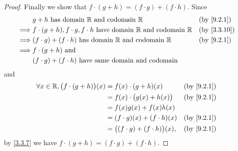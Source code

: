 \begin{proof}
  Finally we show that \(f \cdot (g + h) = (f \cdot g) + (f \cdot h)\).
  Since
  \begin{align*}
             & g + h \text{ has domain } \R \text{ and codomain } \R                                   &  & \by{9.2.1}  \\
    \implies & f \cdot (g + h), f \cdot g, f \cdot h  \text{ have domain } \R \text{ and codomain } \R &  & \by{3.3.10} \\
    \implies & (f \cdot g) + (f \cdot h)  \text{ has domain } \R \text{ and codomain } \R              &  & \by{9.2.1}  \\
    \implies & f \cdot (g + h) \text{ and }                                                                             \\
             & (f \cdot g) + (f \cdot h) \text{ have same domain and codomain}
  \end{align*}
  and
  \begin{align*}
    \forall x \in \R, \big(f \cdot (g + h)\big)(x) & = f(x) \cdot (g + h)(x)                   &  & \by{9.2.1} \\
                                                   & = f(x) \cdot \big(g(x) + h(x)\big)        &  & \by{9.2.1} \\
                                                   & = f(x)g(x) + f(x)h(x)                                     \\
                                                   & = (f \cdot g)(x) + (f \cdot h)(x)         &  & \by{9.2.1} \\
                                                   & = \big((f \cdot g) + (f \cdot h)\big)(x), &  & \by{9.2.1}
  \end{align*}
  by \cref{3.3.7} we have \(f \cdot (g + h) = (f \cdot g) + (f \cdot h)\).
\end{proof}
